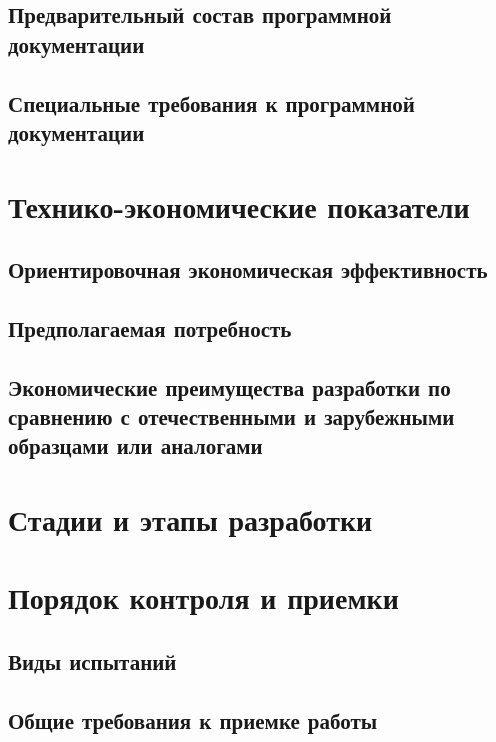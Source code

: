 \documentclass[12pt]{article}
\begin{document}
\subsection{Предварительный состав программной документации}
\subsection{Специальные требования к программной документации}

\newpage
\section{Технико-экономические показатели}
\subsection{Ориентировочная экономическая эффективность}
\subsection{Предполагаемая потребность}
\subsection{Экономические преимущества разработки по сравнению с отечественными и зарубежными образцами или аналогами}

\newpage
\section{Стадии и этапы разработки}


\newpage
\section{Порядок контроля и приемки}
\subsection{Виды испытаний}
\subsection{Общие требования к приемке работы}

\newpage
\end{document}
